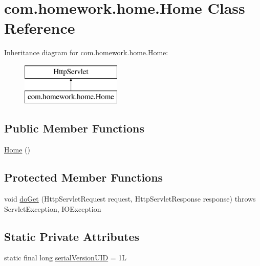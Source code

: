 \hypertarget{classcom_1_1homework_1_1home_1_1_home}{}\section{com.\+homework.\+home.\+Home Class Reference}
\label{classcom_1_1homework_1_1home_1_1_home}
Inheritance diagram for com.\+homework.\+home.\+Home\+:\begin{figure}[H]
\begin{center}
\leavevmode
\includegraphics[height=2.000000cm]{classcom_1_1homework_1_1home_1_1_home}
\end{center}
\end{figure}
\subsection*{Public Member Functions}
\begin{DoxyCompactItemize}
\item 
\hyperlink{classcom_1_1homework_1_1home_1_1_home_ac5127b125cf55fbef4e84aaf0728fd72}{Home} ()
\end{DoxyCompactItemize}
\subsection*{Protected Member Functions}
\begin{DoxyCompactItemize}
\item 
void \hyperlink{classcom_1_1homework_1_1home_1_1_home_a390ad06ac932e0ab47bcad1469c9c174}{do\+Get} (Http\+Servlet\+Request request, Http\+Servlet\+Response response)  throws Servlet\+Exception, I\+O\+Exception 
\end{DoxyCompactItemize}
\subsection*{Static Private Attributes}
\begin{DoxyCompactItemize}
\item 
static final long \hyperlink{classcom_1_1homework_1_1home_1_1_home_ab7840589e7705ec054b07f9488dc9b4e}{serial\+Version\+U\+ID} = 1L
\end{DoxyCompactItemize}


